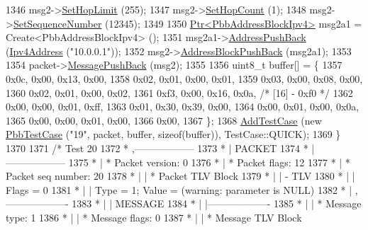 \begin{DoxyCode}
1346     msg2->\hyperlink{classns3_1_1PbbMessage_a532a7e5e135f7491f8a84ab1dfadd28f}{SetHopLimit} (255);
1347     msg2->\hyperlink{classns3_1_1PbbMessage_a882ec7e2e9a9dff6297152c196d54ce4}{SetHopCount} (1);
1348     msg2->\hyperlink{classns3_1_1PbbMessage_a8c24696ac67507afa03c9750daccc47d}{SetSequenceNumber} (12345);
1349 
1350     \hyperlink{classns3_1_1Ptr}{Ptr<PbbAddressBlockIpv4>} msg2a1 = Create<PbbAddressBlockIpv4> ();
1351     msg2a1->\hyperlink{classns3_1_1PbbAddressBlock_a7be545a53d69bd426dbebcf752ed8371}{AddressPushBack} (\hyperlink{classns3_1_1Ipv4Address}{Ipv4Address} (\textcolor{stringliteral}{"10.0.0.1"}));
1352     msg2->\hyperlink{classns3_1_1PbbMessage_a5f623bad2fb1adde7da885e1c92d5311}{AddressBlockPushBack} (msg2a1);
1353 
1354     packet->\hyperlink{classns3_1_1PbbPacket_a4a3170001ef758d9c9c4375b8f089826}{MessagePushBack} (msg2);
1355 
1356     uint8\_t buffer[] = \{
1357       0x0c, 0x00, 0x13, 0x00,
1358       0x02, 0x01, 0x00, 0x01,
1359       0x03, 0x00, 0x08, 0x00,
1360       0x02, 0x01, 0x00, 0x02,
1361       0xf3, 0x00, 0x16, 0x0a,   \textcolor{comment}{/* [16] - 0xf0 */}
1362       0x00, 0x00, 0x01, 0xff,
1363       0x01, 0x30, 0x39, 0x00,
1364       0x00, 0x01, 0x00, 0x0a,
1365       0x00, 0x00, 0x01, 0x00,
1366       0x00,
1367     \};
1368     \hyperlink{classns3_1_1TestCase_a3718088e3eefd5d6454569d2e0ddd835}{AddTestCase} (\textcolor{keyword}{new} \hyperlink{classPbbTestCase}{PbbTestCase} (\textcolor{stringliteral}{"19"}, packet, buffer, \textcolor{keyword}{sizeof}(buffer)), 
      TestCase::QUICK);
1369   \}
1370 
1371   \textcolor{comment}{/* Test 20}
1372 \textcolor{comment}{         * ,------------------}
1373 \textcolor{comment}{         * |  PACKET}
1374 \textcolor{comment}{         * |------------------}
1375 \textcolor{comment}{         * | * Packet version:    0}
1376 \textcolor{comment}{         * | * Packet flags:  12}
1377 \textcolor{comment}{         * | * Packet seq number: 20}
1378 \textcolor{comment}{         * |    | * Packet TLV Block}
1379 \textcolor{comment}{         * |    |     - TLV}
1380 \textcolor{comment}{         * |    |         Flags = 0}
1381 \textcolor{comment}{         * |    |         Type = 1; Value = (warning: parameter is NULL)}
1382 \textcolor{comment}{         * |    ,-------------------}
1383 \textcolor{comment}{         * |    |  MESSAGE}
1384 \textcolor{comment}{         * |    |-------------------}
1385 \textcolor{comment}{         * |    | * Message type:       1}
1386 \textcolor{comment}{         * |    | * Message flags:  0}
1387 \textcolor{comment}{         * |    | * Message TLV Block}

\end{DoxyCode}
